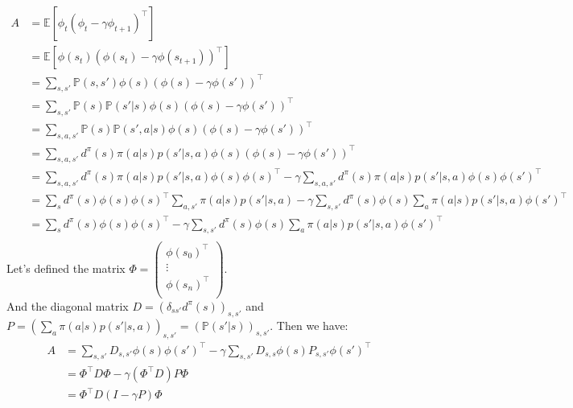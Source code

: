 \documentclass[a4paper]{article}
\newcommand{\transp}{\intercal}
\begin{document}
\begin{equation*}
    \begin{aligned}
        A & = \mathbb{E}\left[ \phi_t (\phi_t - \gamma \phi_{t+1})^\transp \right]                                                                                         \\
          & = \mathbb{E}\left[ \phi(s_t) (\phi(s_t) - \gamma \phi(s_{t+1}))^\transp \right]                                                                                \\
          & = \sum_{s, s'} \mathbb{P}(s, s') \phi(s) (\phi(s) - \gamma \phi(s'))^\transp                                                                                   \\
          & = \sum_{s, s'} \mathbb{P}(s)\mathbb{P}(s'|s) \phi(s) (\phi(s) - \gamma \phi(s'))^\transp                                                                       \\
          & = \sum_{s, a, s'} \mathbb{P}(s)\mathbb{P}(s', a|s) \phi(s) (\phi(s) - \gamma \phi(s'))^\transp                                                                 \\
          & = \sum_{s, a, s'} d^\pi(s) \pi(a|s) p(s'|s, a) \phi(s) (\phi(s) - \gamma \phi(s'))^\transp                                                                     \\
          & = \sum_{s, a, s'} d^\pi(s) \pi(a|s) p(s'|s, a) \phi(s) \phi(s)^\transp - \gamma \sum_{s, a, s'} d^\pi(s)\pi(a|s)p(s'|s, a) \phi(s) \phi(s')^\transp            \\
          & = \sum_{s} d^\pi(s) \phi(s) \phi(s)^\transp \sum_{a, s'} \pi(a|s) p(s'|s, a) - \gamma \sum_{s, s'} d^\pi(s) \phi(s) \sum_a \pi(a|s)p(s'|s, a) \phi(s')^\transp \\
          & = \sum_{s} d^\pi(s) \phi(s) \phi(s)^\transp - \gamma \sum_{s, s'} d^\pi(s) \phi(s) \sum_a \pi(a|s)p(s'|s, a) \phi(s')^\transp                                  \\
    \end{aligned}
\end{equation*}
Let's defined the matrix $\Phi = \begin{pmatrix}
        \phi(s_0)^\transp \\
        \vdots            \\
        \phi(s_n)^\transp \\
    \end{pmatrix}$.\\
And the diagonal matrix $D = (\delta_{ss'}d^\pi(s))_{s, s'}$ and $P = (\sum_a \pi(a|s)p(s'|s, a))_{s, s'} = (\mathbb{P}(s'|s))_{s, s'}$. Then we have:
\begin{equation*}
    \begin{aligned}
        A & = \sum_{s, s'} D_{s,s'} \phi(s) \phi(s')^\transp - \gamma \sum_{s, s'} D_{s,s} \phi(s) P_{s, s'} \phi(s')^\transp \\
          & = \Phi^\transp D \Phi - \gamma (\Phi^\transp D) P \Phi                                                            \\
          & \boxed{= \Phi^\transp D (I - \gamma P) \Phi}
    \end{aligned}
\end{equation*}
\end{document}
